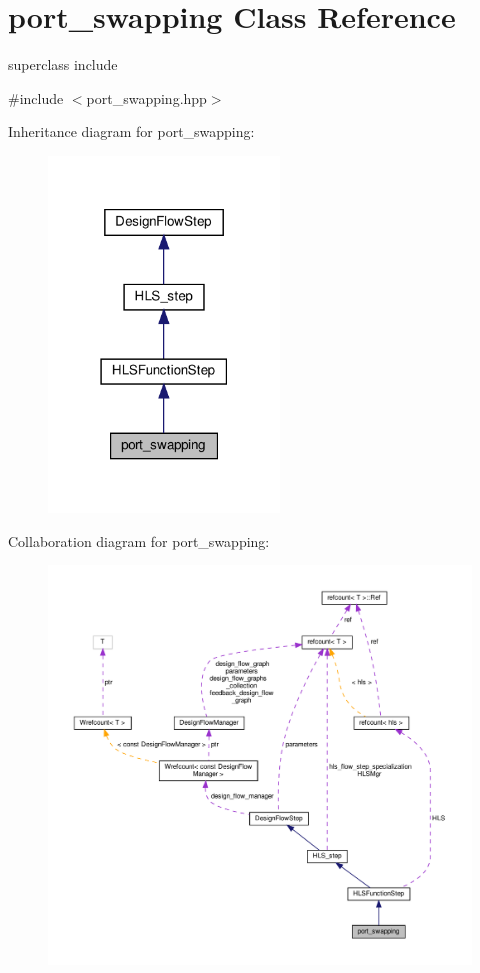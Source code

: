 \hypertarget{classport__swapping}{}\section{port\+\_\+swapping Class Reference}
\label{classport__swapping}


superclass include  




{\ttfamily \#include $<$port\+\_\+swapping.\+hpp$>$}



Inheritance diagram for port\+\_\+swapping\+:
\nopagebreak
\begin{figure}[H]
\begin{center}
\leavevmode
\includegraphics[width=174pt]{d4/d21/classport__swapping__inherit__graph}
\end{center}
\end{figure}


Collaboration diagram for port\+\_\+swapping\+:
\nopagebreak
\begin{figure}[H]
\begin{center}
\leavevmode
\includegraphics[width=350pt]{db/d9d/classport__swapping__coll__graph}
\end{center}
\end{figure}
